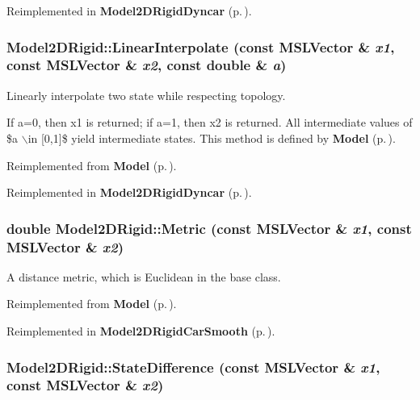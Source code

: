Reimplemented in {\bf Model2DRigid\-Dyncar} {\rm (p.\,\pageref{classModel2DRigidDyncar_a2})}.
\subsubsection{ Model2DRigid::Linear\-Interpolate (const {\bf MSLVector} \& {\em x1}, const {\bf MSLVector} \& {\em x2}, const double \& {\em a})\hspace{0.3cm}{\tt  [virtual]}}\label{classModel2DRigid_a4}


Linearly interpolate two state while respecting topology.

If a=0, then x1 is returned; if a=1, then x2 is returned. All intermediate values of \$a $\backslash$in [0,1]\$ yield intermediate states. This method is defined by {\bf Model} {\rm (p.\,\pageref{classModel})}. 

Reimplemented from {\bf Model} {\rm (p.\,\pageref{classModel_a6})}.

Reimplemented in {\bf Model2DRigid\-Dyncar} {\rm (p.\,\pageref{classModel2DRigidDyncar_a6})}.
\subsubsection{\setlength{\rightskip}{0pt plus 5cm}double Model2DRigid::Metric (const {\bf MSLVector} \& {\em x1}, const {\bf MSLVector} \& {\em x2})\hspace{0.3cm}{\tt  [virtual]}}\label{classModel2DRigid_a6}


A distance metric, which is Euclidean in the base class.



Reimplemented from {\bf Model} {\rm (p.\,\pageref{classModel_a9})}.

Reimplemented in {\bf Model2DRigid\-Car\-Smooth} {\rm (p.\,\pageref{classModel2DRigidCarSmooth_a3})}.
\subsubsection{ Model2DRigid::State\-Difference (const {\bf MSLVector} \& {\em x1}, const {\bf MSLVector} \& {\em x2})\hspace{0.3cm}{\tt  [virtual]}}\label{classModel2DRigid_a5}


